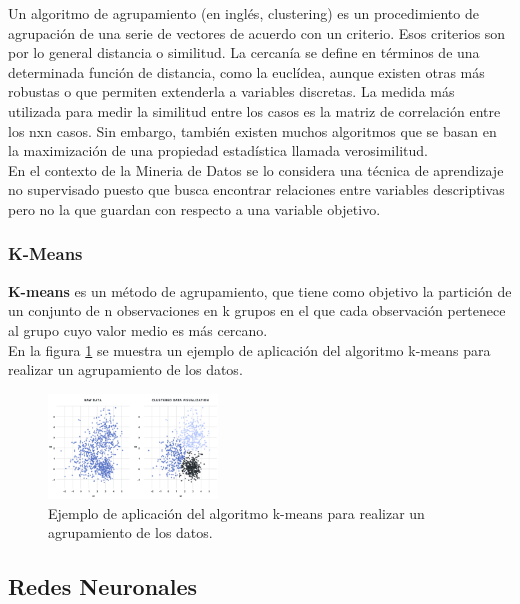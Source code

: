 \documentclass[osajnl,twocolumn,showpacs,superscriptaddress,10pt]{revtex4-1} %
\begin{document}
Un algoritmo de agrupamiento (en inglés, clustering) es un procedimiento de agrupación de una serie de vectores de acuerdo con un criterio. Esos criterios son por lo general distancia o similitud. La cercanía se define en términos de una determinada función de distancia, como la euclídea, aunque existen otras más robustas o que permiten extenderla a variables discretas. La medida más utilizada para medir la similitud entre los casos es la matriz de correlación entre los nxn casos. Sin embargo, también existen muchos algoritmos que se basan en la maximización de una propiedad estadística llamada verosimilitud. \\

En el contexto de la Mineria de Datos se lo considera una técnica de aprendizaje no supervisado puesto que busca encontrar relaciones entre variables descriptivas pero no la que guardan con respecto a una variable objetivo. \\

\subsubsection{K-Means}

\textbf{K-means} es un método de agrupamiento, que tiene como objetivo la partición de un conjunto de n observaciones en k grupos en el que cada observación pertenece al grupo cuyo valor medio es más cercano. \\

En la figura \ref{figure:clustering_example} se muestra un ejemplo de aplicación del algoritmo k-means para realizar un agrupamiento de los datos.

\begin{figure}[H]
    \centering
    \includegraphics[width=0.4\textwidth]{theory/clustering}
    \caption{Ejemplo de aplicación del algoritmo k-means para realizar un agrupamiento de los datos.}
    \label{figure:clustering_example}
\end{figure}

\subsection{Redes Neuronales}
\end{document}
